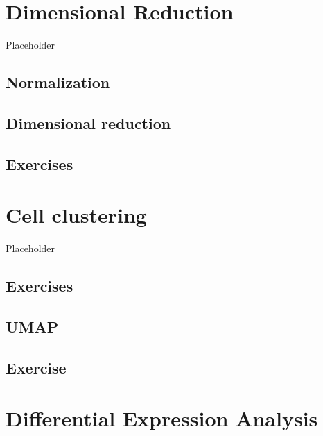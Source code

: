 \documentclass[
]{book}
\begin{document}
\hypertarget{dimensional-reduction}{%
\chapter{Dimensional Reduction}\label{dimensional-reduction}}

Placeholder

\hypertarget{normalization}{%
\section{Normalization}\label{normalization}}

\hypertarget{dimensional-reduction-1}{%
\section{Dimensional reduction}\label{dimensional-reduction-1}}

\hypertarget{exercises-3}{%
\section{Exercises}\label{exercises-3}}

\hypertarget{cell-clustering}{%
\chapter{Cell clustering}\label{cell-clustering}}

Placeholder

\hypertarget{exercises-4}{%
\section{Exercises}\label{exercises-4}}

\hypertarget{umap}{%
\section{UMAP}\label{umap}}

\hypertarget{exercise}{%
\section{Exercise}\label{exercise}}

\hypertarget{differential-expression-analysis}{%
\chapter{Differential Expression Analysis}\label{differential-expression-analysis}}
\end{document}
